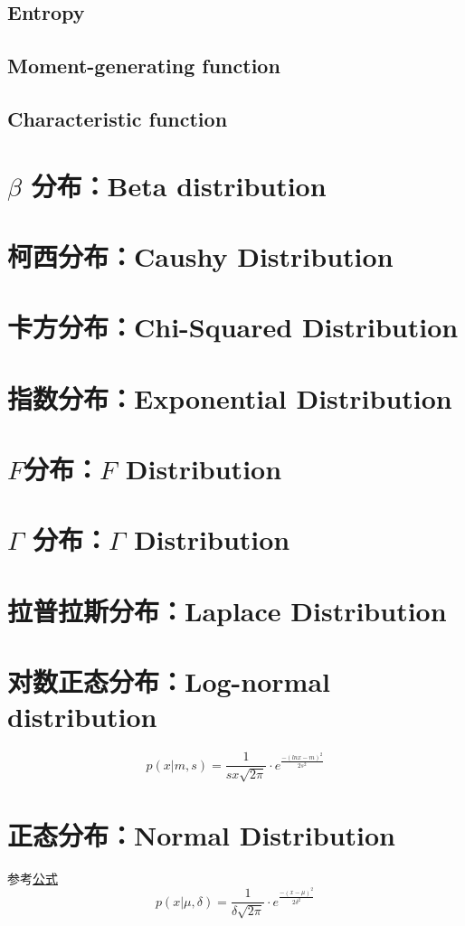 \documentclass[11pt]{book}
\newcounter{#2}
\newcounter{#2}[#1]
\numberwithin{#2}{#1}
\begin{document}
			\subsection{Entropy}
			\subsection{Moment-generating function}
			\subsection{Characteristic function}
			
		
		\section{$ \beta $ 分布：Beta distribution}
		\section{柯西分布：Caushy Distribution}
		\section{卡方分布：Chi-Squared Distribution}
		\section{指数分布：Exponential Distribution}
		\section{$ F $分布：$ F $ Distribution}
		\section{$ \Gamma $ 分布：$ \Gamma $ Distribution}
		\section{拉普拉斯分布：Laplace Distribution}
		\section{对数正态分布：Log-normal distribution}
			\begin{equation}
				p(x|m,s) = \frac{1}{sx \sqrt{2\pi}}\cdot e^{\frac{-(lnx-m)^2}{2s^2}}
			\end{equation}
		\section{正态分布：Normal Distribution}
			参考\hyperref[normal_distribution_function]{公式}
			\begin{equation}
				p(x|\mu,\delta) = \frac{1}{\delta \sqrt{2\pi}}\cdot e^{\frac{-(x-\mu)^2}{2\delta^2}}
			\end{equation}\label{normal_distribution_function}
\end{document}
